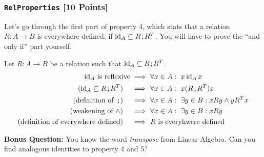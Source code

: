 \subsubsection{\texttt{RelProperties} [10 Points]}
Let's go through the first part of property 4, which stats that a relation $R: A \to B$ is everywhere defined, if $\operatorname{id}_A \subseteq R \texttt{;}R^{T}$.
You will have to prove the ``and only if'' part yourself.

Let $R: A \to B$ be a relation such that $\operatorname{id}_A \subseteq R \texttt{;}R^{T}$. 
\begin{align*}
  \text{$\operatorname{id}_A$ is reflexive}
  \implies\ &\forall x\in A:\ x\operatorname{id}_A x
  \\
  (\text{$\operatorname{id}_A \subseteq R \texttt{;}R^{T}$}) \quad
  \implies\ &\forall x \in A:\ x (R \texttt{;}R^{T}) x
  \\
  (\text{definition of \texttt{;}}) \quad
  \implies\ &\forall x \in A:\ \exists y \in B: xRy \land yR^{T}x
  \\
  (\text{weakening of~$\land$})\quad
  \implies\ &\forall x \in A:\ \exists y \in B: xRy 
  \\
  (\text{definition of everywhere defined})\quad
  \implies\ &\text{$R$ is everyhwere defined}
\end{align*}

\textbf{Bonus Question:} You know the word \emph{transpose} from Linear Algebra.
Can you find analogous identities to property 4 and 5?

